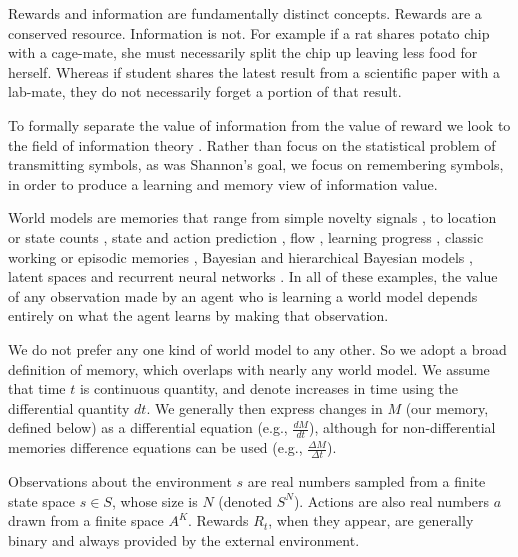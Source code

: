 \documentclass[12pt]{article}
\begin{document}
Rewards and information are fundamentally distinct concepts. Rewards are a conserved resource. Information is not. For example if a rat shares potato chip with a cage-mate, she must necessarily split the chip up leaving less food for herself. Whereas if student shares the latest result from a scientific paper with a lab-mate, they do not necessarily forget a portion of that result.

To formally separate the value of information from the value of reward we look to the field of information theory \cite{Shannon1948}. Rather than focus on the statistical problem of transmitting symbols, as was Shannon’s goal, we focus on remembering symbols, in order to produce a learning and memory view of information value. 

World models are memories that range from simple novelty signals \cite{Kakade2002}, to location or state counts \cite{Bellemare2016,Dayan1993}, state and action prediction \cite{Schmidhuber1991,Pathak2017,Friston2016}, flow \cite{Yang2019}, learning progress \cite{Lopes2012}, classic working or episodic memories \cite{Miller1956,Tulving2002}, Bayesian and hierarchical Bayesian models \cite{Park2017,Itti2009,Friston2016,Tenenbaum2006}, latent spaces \cite{Kingma2013} and recurrent neural networks \cite{Ganguli2008,Ha2018,Schmidhuber2015a,Mante2013}. In all of these examples, the value of any observation made by an agent who is learning a world model depends entirely on what the agent learns by making that observation.

We do not prefer any one kind of world model to any other. So we adopt a broad definition of memory, which overlaps with nearly any world model. We assume that time $t$ is continuous quantity, and denote increases in time using the differential quantity $dt$. We generally then express changes in $M$ (our memory, defined below) as a differential equation (e.g., $\frac{dM}{dt}$), although for non-differential memories difference equations can be used (e.g., $\frac{\Delta M}{\Delta t}$). 

Observations about the environment $s$ are real numbers sampled from a finite state space $s \in S$, whose size is $N$ (denoted $S^N$). Actions are also real numbers $a$ drawn from a finite space $A^K$. Rewards $R_t$, when they appear, are generally binary and always provided by the external environment. 
\end{document}
